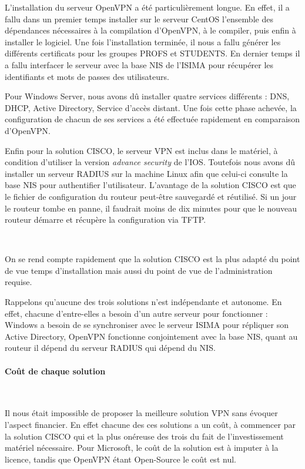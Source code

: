 L'installation du serveur OpenVPN a été particulièrement longue. En effet, il a fallu dans un premier temps installer sur le serveur CentOS l'ensemble des dépendances nécessaires à la compilation d'OpenVPN, à le compiler, puis enfin à installer le logiciel. Une fois l'installation terminée, il nous a fallu générer les différents certificats pour les groupes PROFS et STUDENTS. En dernier temps il a fallu interfacer le serveur avec la base NIS de l'ISIMA pour récupérer les identifiants et mots de passes des utilisateurs.

Pour Windows Server, nous avons dû installer quatre services différents : DNS, DHCP, Active Directory, Service d'accès distant. Une fois cette phase achevée, la configuration de chacun de ses services a été effectuée rapidement en comparaison d'OpenVPN.

Enfin pour la solution CISCO, le serveur VPN est inclus dans le matériel, à condition d'utiliser la version \textit{advance security} de l'IOS. Toutefois nous avons dû installer un serveur RADIUS sur la machine Linux afin que celui-ci consulte la base NIS pour authentifier l'utilisateur. L'avantage de la solution CISCO est que le fichier de configuration du routeur peut-être sauvegardé et réutilisé. Si un jour le routeur tombe en panne, il faudrait moins de dix minutes pour que le nouveau routeur démarre et récupère la configuration via TFTP.

~

On se rend compte rapidement que la solution CISCO est la plus adapté du point de vue temps d'installation mais aussi du point de vue de l'administration requise.

Rappelons qu'aucune des trois solutions n'est indépendante et autonome. En effet, chacune d'entre-elles a besoin d'un autre serveur pour fonctionner : Windows a besoin de se synchroniser avec le serveur ISIMA pour répliquer son Active Directory, OpenVPN fonctionne conjointement avec la base NIS, quant au routeur il dépend du serveur RADIUS qui dépend du NIS.

\paragraph{Coût de chaque solution}
~

Il nous était impossible de proposer la meilleure solution VPN sans évoquer l'aspect financier. En effet chacune des ces solutions a un coût, à commencer par la solution CISCO qui et la plus onéreuse des trois du fait de l'investissement matériel nécessaire. Pour Microsoft, le coût de la solution est à imputer à la licence, tandis que OpenVPN étant Open-Source le coût est nul.

